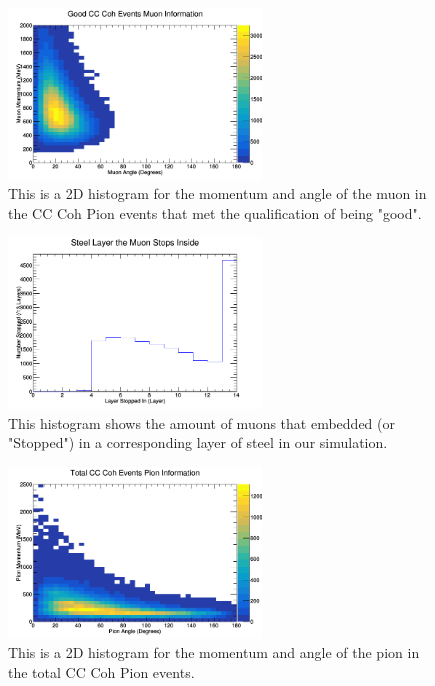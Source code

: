 \documentclass[11pt]{article}
\begin{document}
\begin{figure}[H]
\centering
\includegraphics[width=0.6\textwidth]{NewANMReinSehgalImages/6-GoodCCCohMuonInfoANMRS.png}
\caption{This is a 2D histogram for the momentum and angle of the muon in the CC Coh Pion events that met the qualification of being "good".}
\end{figure}

\begin{figure}[H]
\centering
\includegraphics[width=0.6\textwidth]{NewANMReinSehgalImages/7-LayerPenetrationANMRS.png}
\caption{This histogram shows the amount of muons that embedded (or "Stopped") in a corresponding layer of steel in our simulation.}
\end{figure}

\begin{figure}[H]
\centering
\includegraphics[width=0.6\textwidth]{NewANMReinSehgalImages/8-TotalCCCohPionInfoANMRS.png}
\caption{This is a 2D histogram for the momentum and angle of the pion in the total CC Coh Pion events.}
\end{figure}
\end{document}
